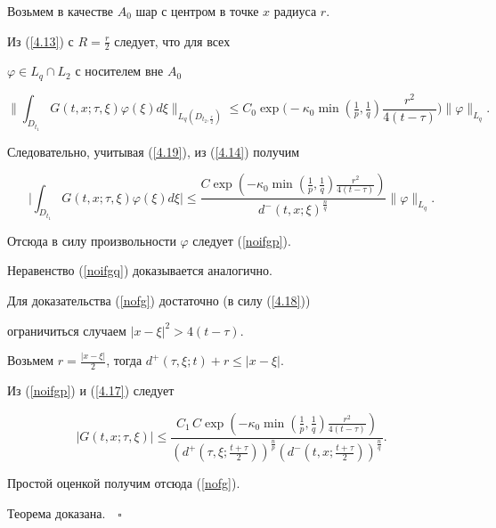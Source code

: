Возьмем в качестве $A_0$ шар с центром в точке $x$ радиуса $r$.


Из (\ref{4.13}) с $R=\frac{r}{2}$ следует, что для всех


$\varphi \in L_q\cap L_2$ с носителем вне $A_0$


$$ 


\bigg\|\int_{D_{t_1}} G(t,x;\tau,\xi)\varphi(\xi)d\xi


\bigg\|_{L_q(D_{t_2,\frac{r}{2}})}\leq


C_0\exp\bigg(-\kappa_0 \min(\tfrac{1}{p},\tfrac{1}{q})


\frac{r^2}{4(t-\tau)}\bigg) \|\varphi\|_{L_q}. 


$$ 


Следовательно, учитывая (\ref{4.19}), из (\ref{4.14}) получим


$$ 


\bigg|\int_{D_{t_1}} G(t,x;\tau,\xi)\varphi(\xi) d\xi \bigg| \leq


\frac{C \exp(-\kappa_0 \min(\frac{1}{p},\frac{1}{q})


\frac{r^2}{4(t-\tau)})}{d^- (t,x;\xi)^{\frac{n}{q}} }\|\varphi\|_{L_q}. 


$$ 


Отсюда в силу произвольности $\varphi $ следует (\ref{noifgp}).


Неравенство (\ref{noifgq}) доказывается аналогично.


 


Для доказательства (\ref{nofg}) достаточно (в силу (\ref{4.18})) 


ограничиться случаем $|x-\xi|^2>4(t-\tau)$.


Возьмем $r=\frac{|x-\xi|}{2}$, тогда $d^+(\tau,\xi;t)+r\leq |x-\xi|$.


Из (\ref{noifgp}) и (\ref{4.17}) следует


$$


|G(t,x;\tau,\xi)|\leq


\frac{C_1 \, C\exp(-\kappa_0 \min(\frac{1}{p},\frac{1}{q})


\frac{r^2}{4(t-\tau)})}{(d^+(\tau,\xi;\frac{t+\tau}{2}))^{\frac{n}{p}}


(d^-(t,x;\frac{t+\tau}{2}))^{\frac{n}{q}} }. 


$$


Простой оценкой получим отсюда (\ref{nofg}).


Теорема доказана.$\quad\square$





